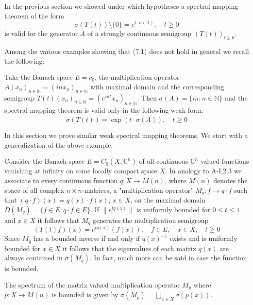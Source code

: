 In the previous section we showed under which hypotheses a spectral mapping theorem of the form
\begin{equation}\label{eq:a3-7.1}
	\sigma(T(t)) \setminus \{0\} = e^{t \cdot \sigma(A)}, \quad t \geq 0
\end{equation}
is valid for the generator $A$ of a strongly continuous semigroup $(T(t))_{t\geq 0}$.

Among the various examples showing that (7.1) does not hold in general we recall the following:

Take the Banach space $E = c_{0}$, the multiplication operator $A(x_{n})_{n\in\mathbb{N}} = (inx_{n})_{n\in\mathbb{N}}$ with maximal domain and the corresponding semigroup $T(t)(x_{n})_{n\in\mathbb{N}} = (e^{int}x_{n})_{n\in\mathbb{N}}$.
Then $\sigma(A) = \{in \colon n \in \mathbb{N}\}$ and the spectral mapping theorem is valid only in the following weak form:
\begin{equation}\label{eq:a3-7.2}
	\sigma(T(t)) = \overline{\exp(t\cdot\sigma(A))}, \quad t \geq 0
\end{equation}

In this section we prove similar weak spectral mapping theorems.
We start with a generalization of the above example.

Consider the Banach space $E = C_{0}(X,\mathbb{C}^{n})$ of all continuous $\mathbb{C}^{n}$-valued functions vanishing at infinity on some locally compact space $X$.
In analogy to A-I,2.3 we associate to every continuous function $q \colon X \to M(n)$, where $M(n)$ denotes the space of all complex $n\times n$-matrices, a "multiplication operator" $M_{q} \colon f \to q\cdot f$ such that $(q\cdot f)(x) = q(x)\cdot f(x)$, $x \in X$, on the maximal domain $D(M_{q}) = \{f \in E \colon q\cdot f \in E\}$.
If $\|e^{tq(x)}\|$ is uniformly bounded for $0 \leq t \leq 1$ and $x \in X$ it follows that $M_{q}$ generates the multiplication semigroup
\[
(T(t)f)(x) = e^{tq(x)}(f(x)), \quad f \in E, \quad x \in X, \quad t \geq 0
\]
Since $M_{q}$ has a bounded inverse if and only if $q(x)^{-1}$ exists and is uniformly bounded for $x \in X$ it follows that the eigenvalues of each matrix $q(x)$ are always contained in $\sigma(M_{q})$.
In fact, much more can be said in case the function is bounded.



\newpage
\begin{lemma}\label{lem:a3-7.1}
	The spectrum of the matrix valued multiplication operator $M_{p}$ where $p \colon X \to M(n)$ is bounded is given by $\sigma(M_{p}) = \overline{\bigcup_{x\in X} \sigma(p(x))}$.
\end{lemma}

